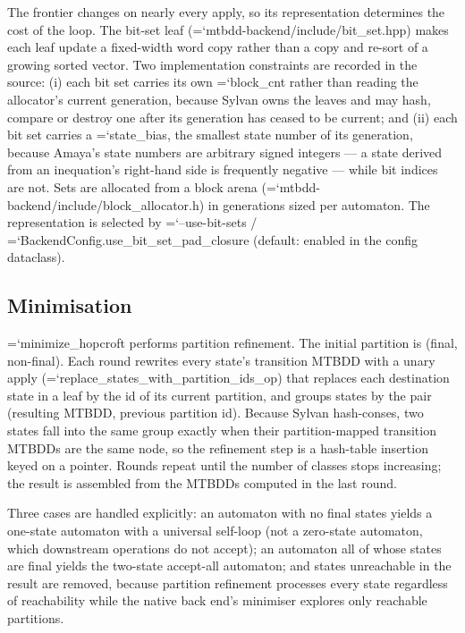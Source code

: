 \documentclass[10pt,a4paper]{article}
\newcommand{\amaya}{Amaya}
\newcommand{\code}[1]{{\small\ttfamily\hyphenchar\font=`\-\relax #1}}
\begin{document}
The frontier changes on nearly every apply, so its representation determines the cost of the loop.  The
bit-set leaf (\code{mtbdd-backend/include/bit\_\allowbreak set.hpp}) makes each leaf update a fixed-width word copy
rather than a copy and re-sort of a growing sorted vector.  Two implementation constraints are recorded
in the source: (i) each bit set carries its own \code{block\_cnt} rather than reading the allocator's
current generation, because Sylvan owns the leaves and may hash, compare or destroy one after its
generation has ceased to be current; and (ii) each bit set carries a \code{state\_bias}, the smallest
state number of its generation, because \amaya{}'s state numbers are arbitrary signed integers --- a
state derived from an inequation's right-hand side is frequently negative --- while bit indices are
not.  Sets are allocated from a block arena
(\code{mtbdd-backend/include/block\_\allowbreak allocator.h}) in generations sized per automaton.  The
representation is selected by \code{--use-bit-sets} /
\code{BackendConfig.\allowbreak use\_\allowbreak bit\_\allowbreak set\_\allowbreak pad\_\allowbreak closure} (default: enabled in the config dataclass).

\subsection{Minimisation}

\code{minimize\_hopcroft} performs partition refinement.  The initial partition is (final, non-final).
Each round rewrites every state's transition MTBDD with a unary apply
(\code{replace\_\allowbreak states\_\allowbreak with\_\allowbreak partition\_\allowbreak ids\_\allowbreak op}) that replaces each destination state in a leaf by the
id of its current partition, and groups states by the pair (resulting MTBDD, previous partition id).
Because Sylvan hash-conses, two states fall into the same group exactly when their partition-mapped
transition MTBDDs are the same node, so the refinement step is a hash-table insertion keyed on a
pointer.  Rounds repeat until the number of classes stops increasing; the result is assembled from the
MTBDDs computed in the last round.

Three cases are handled explicitly: an automaton with no final states yields a one-state automaton with
a universal self-loop (not a zero-state automaton, which downstream operations do not accept); an
automaton all of whose states are final yields the two-state accept-all automaton; and states
unreachable in the result are removed, because partition refinement processes every state regardless of
reachability while the native back end's minimiser explores only reachable partitions.
\end{document}
